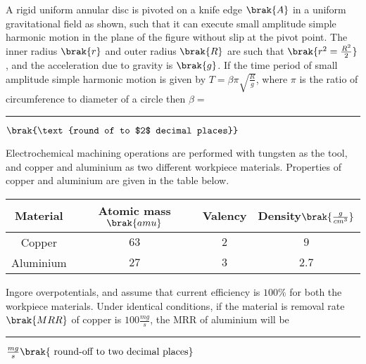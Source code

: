 \item{
A rigid uniform annular disc is pivoted on a knife edge $\brak{A}$ in a uniform gravitational field as shown, such that it can execute small amplitude simple harmonic motion in the plane of the figure without slip at the pivot point. The inner radius $\brak{r}$ and outer radius $\brak{R}$ are such that $\brak{r^2=\frac{R^2}{2}}$, and the acceleration due to gravity is $\brak{g}$. If the time period of small amplitude simple harmonic motion is given by $T = \beta \pi \sqrt{\frac{R}{g}}$, where $\pi$ is the ratio of circumference to diameter of a circle then $\beta=$\rule{2cm}{0.15mm}$\brak{\text{round of to $2$ decimal places}}$
\begin{figure}[H]
\centering
{}%

\label{fig:my_label}
\end{figure}
}
\item{
Electrochemical machining operations are performed with tungsten as the tool, and copper and aluminium as two different workpiece materials. Properties of copper and aluminium are given in the table below.
\begin{table}[h!]
    \centering
    \begin{tabular}{|c|c|c|c|}
        \hline
         Material&Atomic mass$\brak{amu}$&Valency&Density$\brak{\frac{g}{cm^3}}$  \\
         \hline
         Copper&$63$&$2$&$9$\\
         \hline
         Aluminium&$27$&$3$&$2.7$\\
         \hline
    \end{tabular}
    \label{tab:my_label}
\end{table}
Ingore overpotentials, and assume that current efficiency is $100\%$ for both the workpiece materials. Under identical conditions, if the material is removal rate$\brak{MRR}$ of copper is $100\frac{mg}{s}$, the MRR of aluminium will be \rule{2cm}{0.15mm}$\frac{mg}{s}\brak{\text{ round-off to two decimal places}}$\\
}
